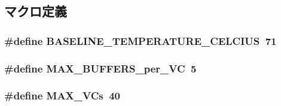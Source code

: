 \subsection{マクロ定義}
\hypertarget{FaultModel_8hh_ac6d4824e8c19e85640d24090644abef8}{
\subsubsection[{BASELINE\_\-TEMPERATURE\_\-CELCIUS}]{\setlength{\rightskip}{0pt plus 5cm}\#define BASELINE\_\-TEMPERATURE\_\-CELCIUS~71}}
\label{FaultModel_8hh_ac6d4824e8c19e85640d24090644abef8}
\hypertarget{FaultModel_8hh_ae962d9d6a16983055ca17865b95be5f1}{
\subsubsection[{MAX\_\-BUFFERS\_\-per\_\-VC}]{\setlength{\rightskip}{0pt plus 5cm}\#define MAX\_\-BUFFERS\_\-per\_\-VC~5}}
\label{FaultModel_8hh_ae962d9d6a16983055ca17865b95be5f1}
\hypertarget{FaultModel_8hh_a9a3db37b47be93a561643b04afb37303}{
\subsubsection[{MAX\_\-VCs}]{\setlength{\rightskip}{0pt plus 5cm}\#define MAX\_\-VCs~40}}
\label{FaultModel_8hh_a9a3db37b47be93a561643b04afb37303}
